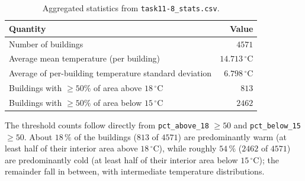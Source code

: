 \begin{table}[htbp]
  \centering
  \caption{Aggregated statistics from \texttt{task11-8\_stats.csv}.}
  \label{tab:ex12-stats}
  \begin{tabular}{lr}
    \toprule
    Quantity & Value \\
    \midrule
    Number of buildings & $4571$ \\
    Average mean temperature (per building) & $14.713\,^{\circ}\mathrm{C}$ \\
    Average of per-building temperature standard deviation & $6.798\,^{\circ}\mathrm{C}$ \\
    Buildings with $\geq 50\%$ of area above $18\,^{\circ}\mathrm{C}$ & $813$ \\
    Buildings with $\geq 50\%$ of area below $15\,^{\circ}\mathrm{C}$ & $2462$ \\
    \bottomrule
  \end{tabular}
\end{table}

\noindent
The threshold counts follow directly from \texttt{pct\_above\_18} $\geq 50$ and \texttt{pct\_below\_15} $\geq 50$.
About $18\,\%$ of the buildings ($813$ of $4571$) are predominantly warm (at least half of their interior area above $18\,^{\circ}\mathrm{C}$), while roughly $54\,\%$ ($2462$ of $4571$) are predominantly cold (at least half of their interior area below $15\,^{\circ}\mathrm{C}$); the remainder fall in between, with intermediate temperature distributions.

